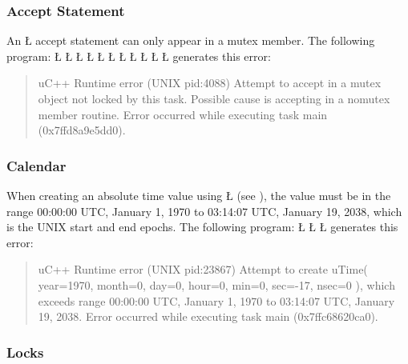 \documentclass[openright,twoside]{report}
\begin{document}
\subsubsection{Accept Statement}

An \LGinlinetrue\LGbegin\lgrinde\L{}\endlgrinde\LGend{} accept statement can only appear in a mutex member.
The following program:
\LGinlinefalse\LGbegin\lgrinde
\L{}
\L{}
\L{\LB{}}
\L{\LB{}}
\L{\LB{}}
\CE{}\L{\LB{}}
\L{\LB{\};}}
\L{}
\L{\LB{}}
\L{\LB{}}
\L{\LB{\}}}
\endlgrinde\LGend
generates this error:
\begin{quote}
\BGfont
uC++ Runtime error (UNIX pid:4088) Attempt to accept in a mutex object not locked by this task.
Possible cause is accepting in a nomutex member routine.
Error occurred while executing task main (0x7ffd8a9e5dd0).
\end{quote}


\subsubsection{Calendar}

When creating an absolute time value using \LGinlinetrue\LGbegin\lgrinde\L{}\endlgrinde\LGend{} (see ), the value must be in the range 00:00:00 UTC, January 1, 1970 to 03:14:07 UTC, January 19, 2038, which is the UNIX start and end epochs.
The following program:
\LGinlinefalse\LGbegin\lgrinde
\L{}
\L{\LB{}}
\L{\LB{\}}}
\endlgrinde\LGend
generates this error:
\begin{quote}
\BGfont
uC++ Runtime error (UNIX pid:23867) Attempt to create uTime( year=1970, month=0, day=0, hour=0, min=0, sec=-17, nsec=0 ), which exceeds range 00:00:00 UTC, January 1, 1970 to 03:14:07 UTC, January 19, 2038.
Error occurred while executing task main (0x7ffc68620ca0).
\end{quote}


\subsubsection{Locks}
\end{document}
